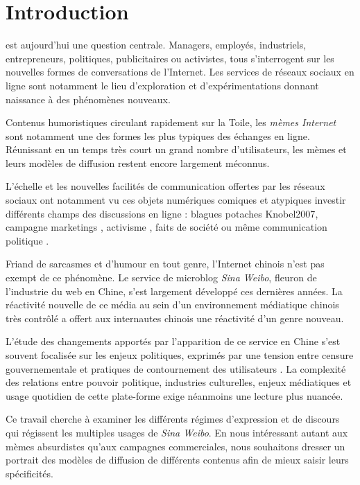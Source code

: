 \chapter*{Introduction}


 est aujourd'hui une question centrale. Managers, employés, industriels, entrepreneurs, politiques, publicitaires ou activistes, tous s'interrogent sur les nouvelles formes de conversations de l'Internet. Les services de réseaux sociaux en ligne sont notamment le lieu d'exploration et d'expérimentations donnant naissance à des phénomènes nouveaux.

Contenus humoristiques circulant rapidement sur la Toile, les \textit{mèmes Internet} sont notamment une des formes les plus typiques des échanges en ligne. Réunissant en un temps très court un grand nombre d'utilisateurs, 
les mèmes et leurs modèles de diffusion restent encore largement méconnus. 

L'échelle et les nouvelles facilités de communication offertes par les réseaux sociaux ont notamment vu ces objets numériques comiques et atypiques investir différents champs des discussions en ligne : blagues potaches {Knobel2007}, campagne marketings \cite{Flor2000}, activisme \cite{Lotan2011},  faits de société \cite{Mina2012} ou même communication politique \cite{Walker2012}.

Friand de sarcasmes et d'humour en tout genre, l'Internet chinois n'est pas exempt de ce phénomène. Le service de microblog \textit{Sina Weibo}, fleuron de l'industrie du web en Chine, s'est largement développé ces dernières années. La réactivité nouvelle de ce média au sein d'un environnement médiatique chinois très contrôlé \cite{MacKinnon2009, Douzet2007} a offert aux internautes chinois une réactivité d'un genre nouveau. 

L'étude des changements apportés par l'apparition de ce service en Chine s'est souvent focalisée sur les enjeux politiques, exprimés par une tension entre  censure gouvernementale \cite{Ng2014} et pratiques de contournement des utilisateurs \cite{Yang2008}. La complexité des relations entre pouvoir politique, industries culturelles, enjeux médiatiques et usage quotidien de cette plate-forme exige néanmoins une lecture plus nuancée.

Ce travail cherche à examiner les différents régimes d'expression et de discours qui régissent les multiples usages de \textit{Sina Weibo}. En nous intéressant autant aux mèmes absurdistes qu'aux campagnes commerciales, nous souhaitons dresser un portrait des modèles de diffusion de différents contenus afin de mieux saisir leurs spécificités.

